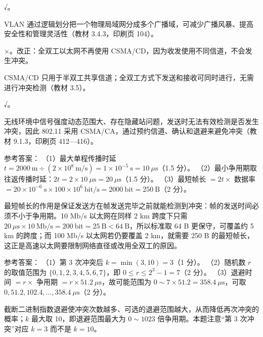 \documentclass[a4paper,11pt]{article}
\begin{document}
\q √。\begin{analysis}VLAN 通过逻辑划分把一个物理局域网分成多个广播域，可减少广播风暴、提高安全性和管理灵活性（教材 3.4.3，印刷页 104）。\end{analysis}

\q ×。改正：全双工以太网不再使用 CSMA/CD，因为收发使用不同信道，不会发生冲突。\begin{analysis}CSMA/CD 只用于半双工共享信道；全双工方式下发送和接收可同时进行，无需进行冲突检测（教材 3.5）。\end{analysis}

\q √。\begin{analysis}无线环境中信号强度动态范围大、存在隐藏站问题，发送时无法有效检测是否发生冲突，因此 802.11 采用 CSMA/CA，通过预约信道、确认和退避来避免冲突（教材 9.1.3，印刷页 412—416）。\end{analysis}


\q 参考答案：
（1）最大单程传播时延 $t=2000\ \text{m}\div(2\times10^{8}\ \text{m/s})=1\times10^{-5}\ \text{s}=10\ \mu\text{s}$（1.5 分）。
（2）最小争用期取往返传播时延：$2t=2\times10\ \mu\text{s}=20\ \mu\text{s}$（1.5 分）。
（3）最短帧长 $=2t\times$ 数据率 $=20\times10^{-6}\ \text{s}\times100\times10^{6}\ \text{bit/s}=2000\ \text{bit}=250\ \text{B}$（2 分）。
\begin{analysis}最短帧长的作用是保证发送方在帧发送完毕之前就能检测到冲突：帧的发送时间必须不小于争用期。10 Mb/s 以太网在同样 2 km 跨度下只需 $20\ \mu\text{s}\times10\ \text{Mb/s}=200\ \text{bit}=25\ \text{B}<64\ \text{B}$，所以标准取 64 B 更保守，可覆盖约 5 km 的跨度；而 100 Mb/s 以太网若仍要覆盖 2 km，就需要 250 B 的最短帧长，这正是高速以太网要限制网络直径或改用全双工的原因。\end{analysis}

\q 参考答案：
（1）第 3 次冲突后 $k=\min(3,10)=3$（1 分）。
（2）随机数 $r$ 的取值范围为 $\{0,1,2,3,4,5,6,7\}$，即 $0\leq r\leq2^3-1=7$（2 分）。
（3）退避时间 $=r\times$ 争用期 $=r\times51.2\ \mu\text{s}$，故可能范围为 $0\sim7\times51.2=358.4\ \mu\text{s}$，可取 $0,51.2,102.4,\dots,358.4\ \mu\text{s}$（2 分）。
\begin{analysis}截断二进制指数退避使冲突次数越多、可选的退避范围越大，从而降低再次冲突的概率；$k$ 最大取 10，即退避范围最大为 $0\sim1023$ 倍争用期。本题注意“第 3 次冲突”对应 $k=3$ 而不是 $k=10$。\end{analysis}

\end{document}
